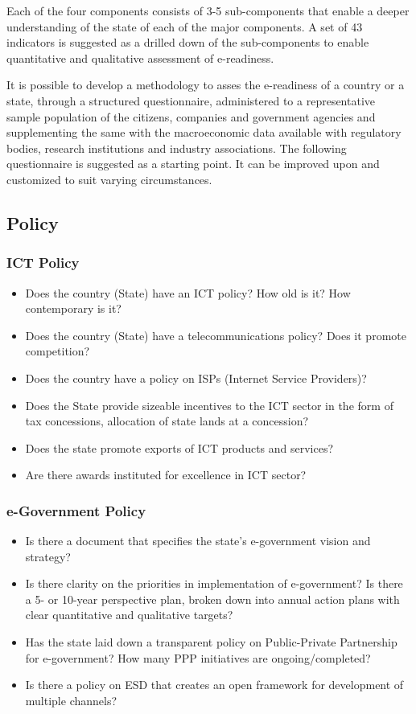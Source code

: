 Each of the four components consists of 3-5 sub-components that enable a deeper understanding of the state of each of the major components. A set of 43 indicators is suggested as a drilled down of the sub-components to enable quantitative and qualitative assessment of e-readiness.

It is possible to develop a methodology to asses the e-readiness of a country or a state, through a structured questionnaire, administered to a representative sample population of the citizens, companies and government agencies and supplementing the same with the macroeconomic data available with regulatory bodies, research institutions and industry associations. The following questionnaire is suggested as a starting point. It can be improved upon and customized to suit varying circumstances.

\subsection{Policy}
\subsubsection*{ICT Policy}
\begin{itemize}
	\item Does the country (State) have an ICT policy? How old is it? How contemporary is it?
	\item Does the country (State) have a telecommunications policy? Does it promote competition?
	\item Does the country have a policy on ISPs (Internet Service Providers)?
	\item Does the State provide sizeable incentives to the ICT sector in the form of tax concessions, allocation of state lands at a concession?
	\item Does the state promote exports of ICT products and services?
	\item Are there awards instituted for excellence in ICT sector?
\end{itemize}

\subsubsection*{e-Government Policy}
\begin{itemize}
	\item Is there a document that specifies the state's e-government vision and strategy?
	\item Is there clarity on the priorities in implementation of e-government? Is there a 5- or 10-year perspective plan, broken down into annual action plans with clear quantitative and qualitative targets?
	\item Has the state laid down a transparent policy on Public-Private Partnership for e-government? How many PPP initiatives are ongoing/completed?
	\item Is there a policy on ESD that creates an open framework for development of multiple channels?
\end{itemize}


